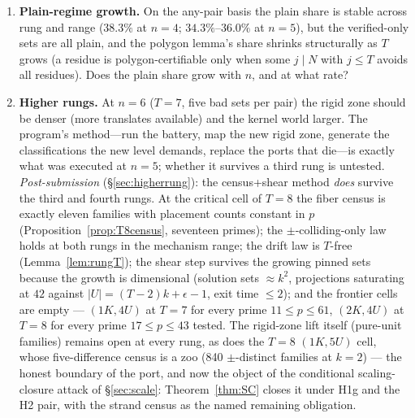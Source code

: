 \begin{enumerate}[leftmargin=1.7em,itemsep=4pt]
\item \textbf{Plain-regime growth.} On the any-pair basis the plain share
  is stable across rung and range ($38.3\%$ at $n=4$; $34.3\%$--$36.0\%$
  at $n=5$), but the verified-only sets are all plain, and the
  polygon lemma's share shrinks structurally as $T$ grows (a residue is
  polygon-certifiable only when some $j\mid N$ with $j\le T$ avoids all
  residues). Does the plain share grow with $n$, and at what rate?

\item \textbf{Higher rungs.} At $n=6$ ($T=7$, five bad sets per pair) the
  rigid zone should be denser (more translates available) and the kernel
  world larger. The program's method---run the battery, map the new
  rigid zone, generate the classifications the new level demands, replace
  the ports that die---is exactly what was executed at $n=5$; whether it
  survives a third rung is untested. \emph{Post-submission}
  (\S\ref{sec:higherrung}): the census+shear method \emph{does} survive
  the third and fourth rungs. At the critical cell of $T=8$ the fiber
  census is exactly eleven families with placement counts constant in
  $p$ (Proposition~\ref{prop:T8census}, seventeen primes); the
  $\pm$-colliding-only law holds at both rungs in the mechanism range;
  the drift law is $T$-free (Lemma~\ref{lem:rungT}); the shear step
  survives the growing pinned sets because the growth is dimensional
  (solution sets $\approx k^2$, projections saturating at $42$ against
  $|U|=(T-2)k+\epsilon-1$, exit time $\le2$); and the frontier cells are
  empty --- $(1K,4U)$ at $T=7$ for every prime $11\le p\le61$, $(2K,4U)$
  at $T=8$ for every prime $17\le p\le43$ tested. The rigid-zone lift
  itself (pure-unit families) remains open at every rung, as does the
  $T=8$ $(1K,5U)$ cell, whose five-difference census is a zoo (840
  $\pm$-distinct families at $k=2$) --- the honest boundary of the port,
  and now the object of the conditional scaling-closure attack of
  \S\ref{sec:scale}: Theorem~\ref{thm:SC} closes it under H1g and the
  H2 pair, with the strand census as the named remaining obligation.


\end{enumerate}
